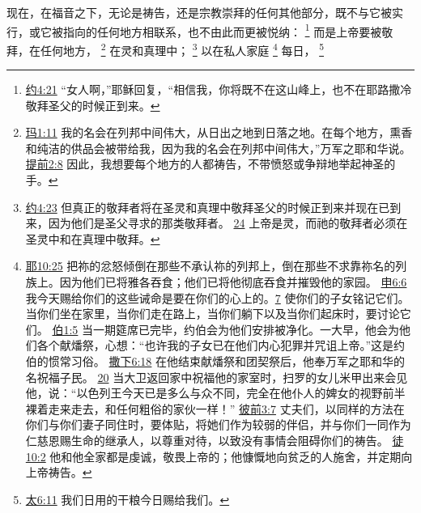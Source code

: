 \documentclass[12pt, a4paper, oneside]{ctexart}
\newcounter{parnum}[section]
\newcommand{\N}{%
   \noindent\refstepcounter{parnum}%
    \makebox[\parindent][l]{\textbf{\arabic{parnum}.}}}
\begin{document}
\N 现在，在福音之下，无论是祷告，还是宗教崇拜的任何其他部分，既不与它被实行，或它被指向的任何地方相联系，也不由此而更被悦纳：
	\footnote {
		\href{https://biblehub.com/john/4-21.htm}{约4:21} “女人啊，”耶稣回复，“相信我，你将既不在这山峰上，也不在耶路撒冷敬拜圣父的时候正到来。
	}
	而是上帝要被敬拜，在任何地方，
	\footnote {
		\href{https://biblehub.com/malachi/1-11.htm}{玛1:11} 我的名会在列邦中间伟大，从日出之地到日落之地。在每个地方，熏香和纯洁的供品会被带给我，因为我的名会在列邦中间伟大，”万军之耶和华说。
		\href{https://biblehub.com/1_timothy/2-8.htm}{提前2:8} 因此，我想要每个地方的人都祷告，不带愤怒或争辩地举起神圣的手。
	}
	在灵和真理中；
	\footnote {
		\href{https://biblehub.com/john/4-23.htm}{约4:23} 但真正的敬拜者将在圣灵和真理中敬拜圣父的时候正到来并现在已到来，因为他们是圣父寻求的那类敬拜者。
		\href{https://biblehub.com/john/4-24.htm}{24} 上帝是灵，而祂的敬拜者必须在圣灵中和在真理中敬拜。
	}
	以在私人家庭
	\footnote {
		\href{https://biblehub.com/jeremiah/10-25.htm}{耶10:25} 把祢的忿怒倾倒在那些不承认祢的列邦上，倒在那些不求靠祢名的列族上。因为他们已将雅各吞食；他们已将他彻底吞食并摧毁他的家园。
		\href{https://biblehub.com/deuteronomy/6-6.htm}{申6:6} 我今天赐给你们的这些诫命是要在你们的心上的。\href{https://biblehub.com/deuteronomy/6-7.htm}{7} 使你们的子女铭记它们。当你们坐在家里，当你们走在路上，当你们躺下以及当你们起床时，要讨论它们。
		\href{https://biblehub.com/job/1-5.htm}{伯1:5} 当一期筵席已完毕，约伯会为他们安排被净化。一大早，他会为他们各个献燔祭，心想：“也许我的子女已在他们内心犯罪并咒诅上帝。”这是约伯的惯常习俗。
		\href{https://biblehub.com/2_samuel/6-18.htm}{撒下6:18} 在他结束献燔祭和团契祭后，他奉万军之耶和华的名祝福子民。
		\href{https://biblehub.com/2_samuel/6-20.htm}{20} 当大卫返回家中祝福他的家室时，扫罗的女儿米甲出来会见他，说：“以色列王今天已是多么与众不同，完全在他仆人的婢女的视野前半裸着走来走去，和任何粗俗的家伙一样！”
		\href{https://biblehub.com/1_peter/3-7.htm}{彼前3:7} 丈夫们，以同样的方法在你们与你们妻子同住时，要体贴，将她们作为较弱的伴侣，并与你们一同作为仁慈恩赐生命的继承人，以尊重对待，以致没有事情会阻碍你们的祷告。
		\href{https://biblehub.com/acts/10-2.htm}{徒10:2} 他和他全家都是虔诚，敬畏上帝的；他慷慨地向贫乏的人施舍，并定期向上帝祷告。
	}
	每日，
	\footnote {
		\href{https://biblehub.com/matthew/6-11.htm}{太6:11} 我们日用的干粮今日赐给我们。
	}
\end{document}

